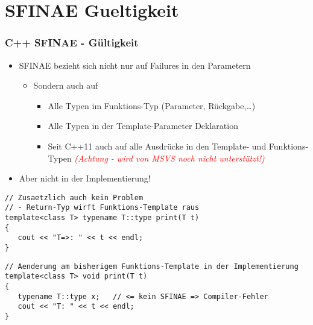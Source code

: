 \documentclass{beamer}
\begin{document}
\section{SFINAE Gueltigkeit}
\begin{frame}[fragile]
\frametitle{C++ SFINAE - Gültigkeit}

\begin{itemize}
\item SFINAE bezieht sich nicht nur auf Failures in den Parametern

\begin{itemize}
\item Sondern auch auf

\begin{itemize}
\item Alle Typen im Funktions-Typ (Parameter, Rückgabe,…)
\item Alle Typen in der Template-Parameter Deklaration
\item Seit C++11 auch auf alle Ausdrücke in den Template- und Funktions-Typen \textcolor{red}{\textit{(Achtung - wird von MSVS noch nicht unterstützt!)}}


\end{itemize}
\end{itemize}

\item Aber nicht in der Implementierung!
\end{itemize}

\begin{lstlisting}
// Zusaetzlich auch kein Problem
// - Return-Typ wirft Funktions-Template raus
template<class T> typename T::type print(T t) 
{
   cout << "T=>: " << t << endl;
}
\end{lstlisting}

\begin{lstlisting}
// Aenderung am bisherigem Funktions-Template in der Implementierung
template<class T> void print(T t)
{
   typename T::type x;   // <= kein SFINAE => Compiler-Fehler
   cout << "T: " << t << endl;
}
\end{lstlisting}
\end{frame}
\end{document}
